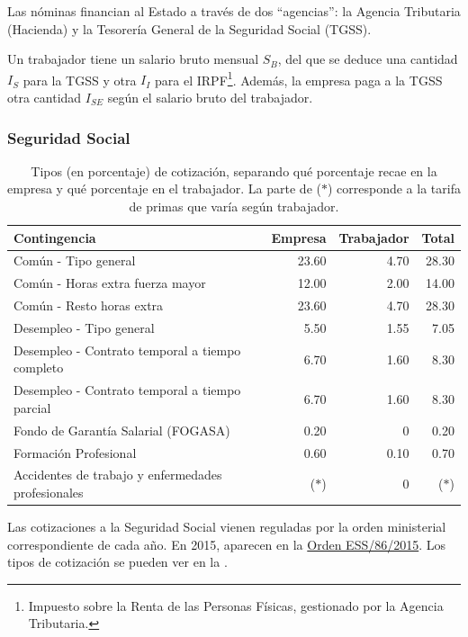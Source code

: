 \documentclass[nochap,palatino,notitlepage]{apuntes}
\begin{document}
Las nóminas financian al Estado a través de dos ``agencias'': la Agencia Tributaria (Hacienda) y la Tesorería General de la Seguridad Social (TGSS).

Un trabajador tiene un salario bruto mensual $S_B$, del que se deduce una cantidad $I_S$ para la TGSS y otra $I_I$ para el IRPF\footnote{Impuesto sobre la Renta de las Personas Físicas, gestionado por la Agencia Tributaria.}. Además, la empresa paga a la TGSS otra cantidad $I_{SE}$ según el salario bruto del trabajador.

\subsubsection{Seguridad Social}

\begin{table}[hbtp]
\centering
\footnotesize
\begin{tabular}{l|r|r|r}
\textbf{Contingencia} & \textbf{Empresa} & \textbf{Trabajador} & \textbf{Total} \\ \toprule
Común - Tipo general & 23.60 & 4.70 & 28.30 \\
Común - Horas extra fuerza mayor & 12.00 & 2.00 & 14.00 \\
Común - Resto horas extra & 23.60 & 4.70 & 28.30 \\ \midrule
Desempleo - Tipo general & 5.50 & 1.55 & 7.05 \\
Desempleo - Contrato temporal a tiempo completo & 6.70 & 1.60 & 8.30 \\
Desempleo - Contrato temporal a tiempo parcial & 6.70 & 1.60 & 8.30 \\ \midrule
Fondo de Garantía Salarial (FOGASA) & 0.20 & 0 & 0.20 \\ \midrule
Formación Profesional & 0.60 & 0.10 & 0.70 \\ \midrule
Accidentes de trabajo y enfermedades profesionales & ($\ast$) & 0 & ($\ast$) \\ \midrule
\end{tabular}
\caption{Tipos (en porcentaje) de cotización, separando qué porcentaje recae en la empresa y qué porcentaje en el trabajador. La parte de ($\ast$) corresponde a la tarifa de primas que varía según trabajador.}
\label{tab:TiposSegSocial}
\end{table}

Las cotizaciones a la Seguridad Social vienen reguladas por la orden ministerial correspondiente de cada año. En 2015, aparecen en la \href{http://www.boe.es/diario_boe/txt.php?id=BOE-A-2015-847}{Orden ESS/86/2015}. Los tipos de cotización se pueden ver en la .
\end{document}
